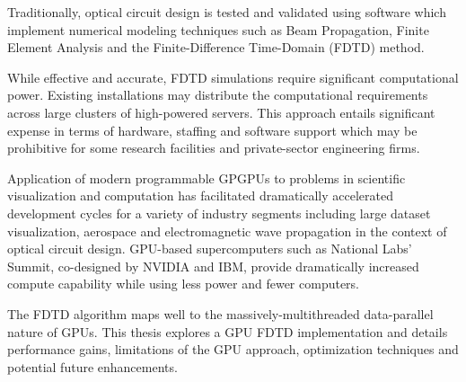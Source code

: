 Traditionally, optical circuit design is tested and validated using software which implement numerical modeling techniques such as Beam Propagation, Finite Element Analysis and the Finite-Difference Time-Domain (FDTD) method.

While effective and accurate, FDTD simulations require significant computational power. Existing installations may distribute the computational requirements across large clusters of high-powered servers. This approach entails significant expense in terms of hardware, staffing and software support which may be prohibitive for some research facilities and private-sector engineering firms.

Application of modern programmable GPGPUs to problems in scientific visualization and computation has facilitated dramatically accelerated development cycles for a variety of industry segments including large dataset visualization\cite{raycasting}, aerospace\cite{Strzodka2013381} and electromagnetic wave propagation in the context of optical circuit design. GPU-based supercomputers such as National Labs' Summit\cite{nvidiaNationalLabs}, co-designed by NVIDIA and IBM, provide dramatically increased compute capability while using less power and fewer computers. 

The FDTD algorithm maps well to the massively-multithreaded data-parallel nature of GPUs. This thesis explores a GPU FDTD implementation and details performance gains, limitations of the GPU approach, optimization techniques and potential future enhancements. 